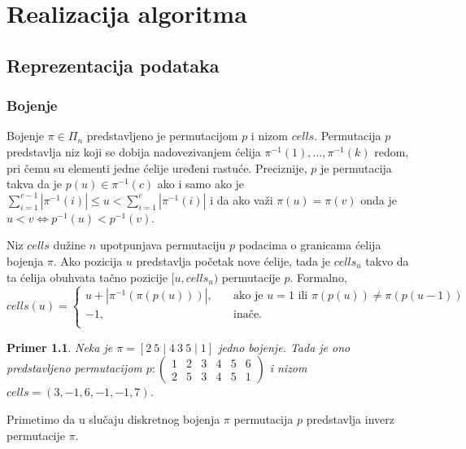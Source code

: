 \documentclass[12pt,oneside]{memoir}
\newtheorem{example}{Primer}
\theoremstyle{definition}
\begin{document}
\chapter{Realizacija algoritma}

 \section{Reprezentacija podataka}

  \subsection{Bojenje}

   Bojenje $\pi \in \Pi_n$ predstavljeno je permutacijom $p$ i nizom $cells$.
   Permutacija $p$ predstavlja niz koji se dobija nadovezivanjem ćelija
   $\pi^{-1}(1), \dots, \pi^{-1}(k)$ redom, pri čemu su elementi jedne ćelije
   uređeni rastuće. Preciznije, $p$ je permutacija takva da je $p(u) \in
   \pi^{-1}(c)$ ako i samo ako je $\sum_{i = 1}^{c-1} |\pi^{-1}(i)| \leq u <
   \sum_{i = 1}^c |\pi^{-1}(i)|$ i da ako važi $\pi(u) = \pi(v)$ onda je $u < v
   \iff p^{-1}(u) < p^{-1}(v)$.

   Niz $cells$ dužine $n$ upotpunjava permutaciju $p$ podacima o granicama
   ćelija bojenja $\pi$. Ako pozicija $u$ predstavlja početak nove ćelije, tada
   je $cells_u$ takvo da ta ćelija obuhvata tačno pozicije $[u, cells_u)$
   permutacije $p$.  Formalno,
   $$ cells(u) =
     \begin{cases}
		 u + |\pi^{-1}(\pi(p(u)))|, & \quad \text{ako je } u = 1 \text{ ili }
		 \pi(p(u)) \neq \pi(p(u-1)) \\
		 -1, & \quad \text{inače.} \\
	 \end{cases}
   $$

   \begin{example}
	   Neka je $\pi = [2\ 5 \mid 4\ 3\ 5 \mid 1]$ jedno bojenje. Tada je ono
	   predstavljeno permutacijom
	   $p :
	   \begin{pmatrix}
		   1 & 2 & 3 & 4 & 5 & 6\\
		   2 & 5 & 3 & 4 & 5 & 1
	   \end{pmatrix}$ i nizom $cells = (3, -1, 6, -1, -1, 7)$.
   \end{example}

   Primetimo da u slučaju diskretnog bojenja $\pi$ permutacija $p$ predstavlja
   inverz permutacije $\pi$.
\end{document}
